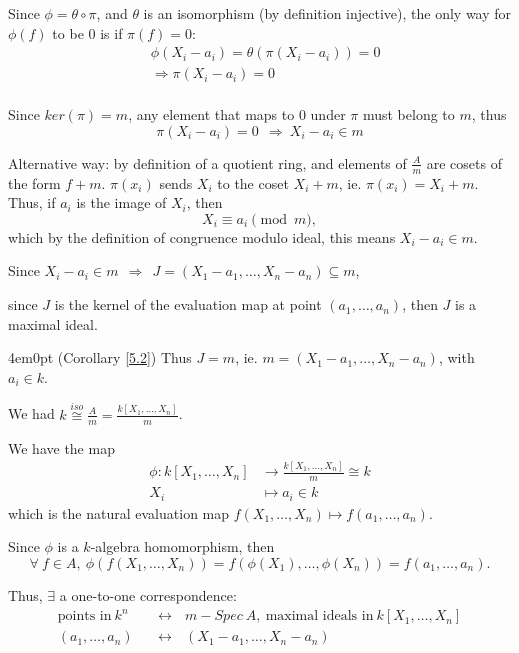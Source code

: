 \documentclass{article}
\theoremstyle{definition}
\begin{document}
Since $\phi = \theta \circ \pi$, and $\theta$ is an isomorphism (by definition injective), the only way for $\phi(f)$ to be $0$ is if $\pi(f)=0$:
\begin{align*}
  &\phi(X_i-a_i)=\theta(\pi(X_i - a_i)) = 0\\
  &\Longrightarrow \pi(X_i-a_i)=0\\
\end{align*}

Since $ker(\pi)=m$, any element that maps to $0$ under $\pi$ must belong to $m$, thus
$$\pi(X_i - a_i) =0 ~~\Longrightarrow~ X_i-a_i\in m$$

Alternative way: by definition of a quotient ring, and elements of $\frac{A}{m}$ are cosets of the form $f+m$. $\pi(x_i)$ sends $X_i$ to the coset $X_i+m$, ie. $\pi(x_i)=X_i+m$. Thus, if $a_i$ is the image of $X_i$, then
$$X_i \equiv a_i \pmod m,$$
which by the definition of congruence modulo ideal, this means $X_i -a_i \in m$.

\vspace{0.5cm}

Since $X_i - a_i \in m ~~\Longrightarrow~~ J=(X_1 - a_1, \ldots, X_n -a_n) \subseteq m$,

since $J$ is the kernel of the evaluation map at point $(a_1, \ldots, a_n)$, then $J$ is a maximal ideal.


\begin{adjustwidth}{4em}{0pt}
  (Corollary \ref{5.2}) Thus $J=m$, ie. $m=(X_1 - a_1, \ldots, X_n -a_n)$, with $a_i \in k$.

  \vspace{0.4cm}
  We had $k \stackrel{iso}{\cong} \frac{A}{m} = \frac{k[X_1, \ldots, X_n]}{m}$.

  We have the map
  \begin{align*}
    \phi: k[X_1, \ldots, X_n] &\longrightarrow \frac{k[X_1, \ldots, X_n]}{m} \cong k\\
    X_i &\mapsto a_i \in k
  \end{align*}
  which is the natural evaluation map $f(X_1, \ldots, X_n) \longmapsto f(a_1, \ldots, a_n)$.

  Since $\phi$ is a $k$-algebra homomorphism, then
  $$\forall~ f \in A,~ \phi(f(X_1, \ldots, X_n)) = f(\phi(X_1), \ldots, \phi(X_n)) = f(a_1, \ldots, a_n).$$

  Thus, $\exists$ a one-to-one correspondence:
  \begin{align*}
    \text{points in}~ k^n ~~~ &\longleftrightarrow~~~ m-Spec~A, ~\text{maximal ideals in}~ k[X_1, \ldots, X_n]\\
    (a_1, \ldots, a_n) ~~~&\longleftrightarrow~~~ (X_1 - a_1, \ldots, X_n - a_n)
  \end{align*}
\end{adjustwidth}
\end{document}
